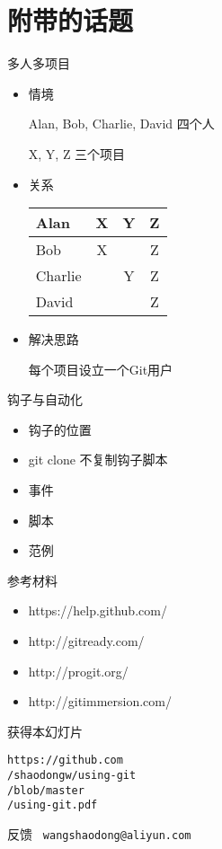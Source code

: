 \part{附带的话题}

\begin{frame}[<+->]{多人多项目}
    \begin{itemize}
        \item 情境

        Alan, Bob, Charlie, David 四个人

        X, Y, Z 三个项目
        \item 关系

\begin{center}
    \begin{tabular}{l|c c c}
        \hline
        Alan    &   X  &  Y  &  Z  \\ \hline
        Bob     &   X  &     &  Z  \\ \hline
        Charlie &      &  Y  &  Z  \\ \hline
        David   &      &     &  Z  \\ \hline
    \end{tabular}
\end{center}

        \item 解决思路

        每个项目设立一个Git用户
    \end{itemize}
\end{frame}


\begin{frame}[<+->][fragile]{钩子与自动化}
    \begin{itemize}
        \item 钩子的位置
        \item git clone 不复制钩子脚本
        \item 事件
        \item 脚本
        \item 范例
    \end{itemize}
\end{frame}

\begin{frame}[fragile]{参考材料}
    \begin{itemize}
        \item https://help.github.com/
        \item http://gitready.com/
        \item http://progit.org/
        \item http://gitimmersion.com/
    \end{itemize}
\end{frame}

\begin{frame}{获得本幻灯片}

{\Huge\tt https://github.com\\
/shaodongw/using-git\\
/blob/master\\
/using-git.pdf\\}
\end{frame}

\begin{frame}[<+->][fragile]{反馈}
{\huge\tt
wangshaodong@aliyun.com
}
\end{frame}

